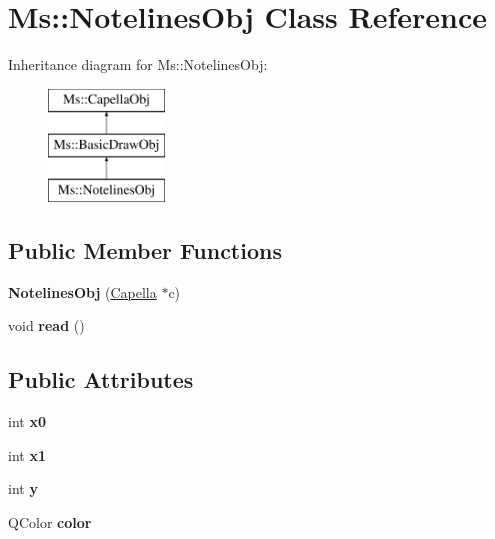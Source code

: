 \hypertarget{class_ms_1_1_notelines_obj}{}\section{Ms\+:\+:Notelines\+Obj Class Reference}
\label{class_ms_1_1_notelines_obj}
Inheritance diagram for Ms\+:\+:Notelines\+Obj\+:\begin{figure}[H]
\begin{center}
\leavevmode
\includegraphics[height=3.000000cm]{class_ms_1_1_notelines_obj}
\end{center}
\end{figure}
\subsection*{Public Member Functions}
\begin{DoxyCompactItemize}
\item 
\mbox{\label{class_ms_1_1_notelines_obj_aaf2ef3bfba7971905047b457d8438586}} 
{\bfseries Notelines\+Obj} (\hyperlink{class_ms_1_1_capella}{Capella} $\ast$c)
\item 
\mbox{\label{class_ms_1_1_notelines_obj_a8bc5b20fee87518a7d4ba41e38e7ef2f}} 
void {\bfseries read} ()
\end{DoxyCompactItemize}
\subsection*{Public Attributes}
\begin{DoxyCompactItemize}
\item 
\mbox{\label{class_ms_1_1_notelines_obj_a3ab0811c926d5b490a2bb4ce32dc0c88}} 
int {\bfseries x0}
\item 
\mbox{\label{class_ms_1_1_notelines_obj_afd17086f62feab685beb5390137d93e1}} 
int {\bfseries x1}
\item 
\mbox{\label{class_ms_1_1_notelines_obj_a626caef04fd79a8dd7167f84899fd113}} 
int {\bfseries y}
\item 
\mbox{\label{class_ms_1_1_notelines_obj_ae80c44498ad3a083657f7f7e46cd8cdd}} 
Q\+Color {\bfseries color}
\end{DoxyCompactItemize}
